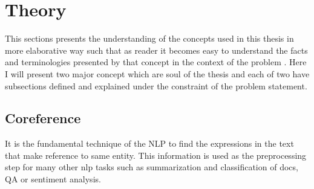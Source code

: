 \documentclass[11pt]{article}
\begin{document}
\section{Theory}
This sections presents the understanding of the concepts used in this thesis in more elaborative way such that as reader it becomes easy to understand the facts and terminologies presented by that concept in the context of the problem . Here I will present two major concept which are soul of the thesis and each of two have subsections defined and explained under the constraint of the problem statement. 

 \subsection{Coreference}
It is the fundamental technique of the NLP to find the expressions in the text that make reference to same entity. This information is used as the preprocessing step for many other nlp tasks such as summarization and classification of docs, QA or sentiment analysis.
\end{document}
